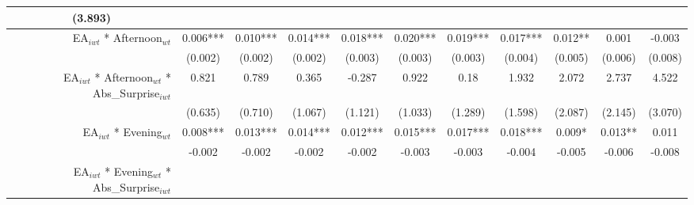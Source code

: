 \begin{table}
{\begin{tabular}{rcccccccccc}
  \multicolumn{1}{c|}{(3.893)} \\ \hline
\multicolumn{1}{|r|}{EA$_{iwt}$ * Afternoon$_{wt}$} &
  \multicolumn{1}{c|}{0.006***} &
  \multicolumn{1}{c|}{0.010***} &
  \multicolumn{1}{c|}{0.014***} &
  \multicolumn{1}{c|}{0.018***} &
  \multicolumn{1}{c|}{0.020***} &
  \multicolumn{1}{c|}{0.019***} &
  \multicolumn{1}{c|}{0.017***} &
  \multicolumn{1}{c|}{0.012**} &
  \multicolumn{1}{c|}{0.001} &
  \multicolumn{1}{c|}{-0.003} \\ \hline
\multicolumn{1}{|r|}{} &
  \multicolumn{1}{c|}{(0.002)} &
  \multicolumn{1}{c|}{(0.002)} &
  \multicolumn{1}{c|}{(0.002)} &
  \multicolumn{1}{c|}{(0.003)} &
  \multicolumn{1}{c|}{(0.003)} &
  \multicolumn{1}{c|}{(0.003)} &
  \multicolumn{1}{c|}{(0.004)} &
  \multicolumn{1}{c|}{(0.005)} &
  \multicolumn{1}{c|}{(0.006)} &
  \multicolumn{1}{c|}{(0.008)} \\ \hline
\multicolumn{1}{|r|}{EA$_{iwt}$ * Afternoon$_{wt}$ * Abs\_Surprise$_{iwt}$} &
  \multicolumn{1}{c|}{0.821} &
  \multicolumn{1}{c|}{0.789} &
  \multicolumn{1}{c|}{0.365} &
  \multicolumn{1}{c|}{-0.287} &
  \multicolumn{1}{c|}{0.922} &
  \multicolumn{1}{c|}{0.18} &
  \multicolumn{1}{c|}{1.932} &
  \multicolumn{1}{c|}{2.072} &
  \multicolumn{1}{c|}{2.737} &
  \multicolumn{1}{c|}{4.522} \\ \hline
\multicolumn{1}{|r|}{} &
  \multicolumn{1}{c|}{(0.635)} &
  \multicolumn{1}{c|}{(0.710)} &
  \multicolumn{1}{c|}{(1.067)} &
  \multicolumn{1}{c|}{(1.121)} &
  \multicolumn{1}{c|}{(1.033)} &
  \multicolumn{1}{c|}{(1.289)} &
  \multicolumn{1}{c|}{(1.598)} &
  \multicolumn{1}{c|}{(2.087)} &
  \multicolumn{1}{c|}{(2.145)} &
  \multicolumn{1}{c|}{(3.070)} \\ \hline
\multicolumn{1}{|r|}{EA$_{iwt}$ * Evening$_{wt}$} &
  \multicolumn{1}{c|}{0.008***} &
  \multicolumn{1}{c|}{0.013***} &
  \multicolumn{1}{c|}{0.014***} &
  \multicolumn{1}{c|}{0.012***} &
  \multicolumn{1}{c|}{0.015***} &
  \multicolumn{1}{c|}{0.017***} &
  \multicolumn{1}{c|}{0.018***} &
  \multicolumn{1}{c|}{0.009*} &
  \multicolumn{1}{c|}{0.013**} &
  \multicolumn{1}{c|}{0.011} \\ \hline
\multicolumn{1}{|r|}{} &
  \multicolumn{1}{c|}{-0.002} &
  \multicolumn{1}{c|}{-0.002} &
  \multicolumn{1}{c|}{-0.002} &
  \multicolumn{1}{c|}{-0.002} &
  \multicolumn{1}{c|}{-0.003} &
  \multicolumn{1}{c|}{-0.003} &
  \multicolumn{1}{c|}{-0.004} &
  \multicolumn{1}{c|}{-0.005} &
  \multicolumn{1}{c|}{-0.006} &
  \multicolumn{1}{c|}{-0.008} \\ \hline
\multicolumn{1}{|r|}{EA$_{iwt}$ * Evening$_{wt}$ * Abs\_Surprise$_{iwt}$} &

\end{tabular}}
\end{table}
